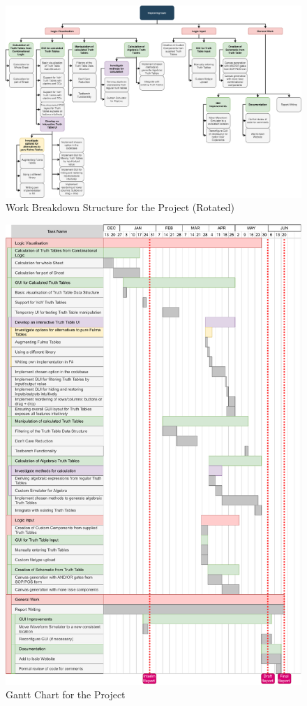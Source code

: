 \begin{figure}
    \centering
    \includegraphics[width=22cm,angle=270,origin=c]{04.ImpPlan/wbs.eps}
    \caption{Work Breakdown Structure for the Project (Rotated)}
    \label{fig:wbs}
\end{figure}

\begin{figure}
    \centering
    \includegraphics*[width=\textwidth]{04.ImpPlan/gantt_update.pdf}
    \caption{Gantt Chart for the Project}
    \label{fig:gantt}
\end{figure}